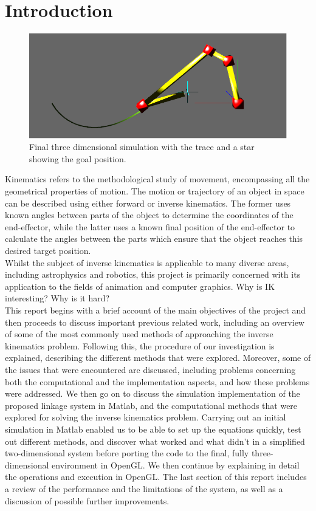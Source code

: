 \documentclass[paper=a4, fontsize=11pt]{scrartcl} %
\numberwithin{equation}{section} %
\numberwithin{figure}{section} %
\numberwithin{table}{section} %
\begin{document}
\section{Introduction}
\begin{figure}
\centering
\includegraphics[scale=0.4]{chain3Dexamplev2}
\caption{Final three dimensional simulation with the trace and a star showing the goal position.}
\label{fig:3Dpicture}
\end{figure}

Kinematics refers to the methodological study of movement, encompassing all the geometrical properties of motion. The motion or trajectory of an object in space can be described using either forward or inverse kinematics. The former uses known angles between parts of the object to determine the coordinates of the end-effector, while the latter uses a known final position of the end-effector to calculate the angles between the parts which ensure that the object reaches this desired target position. \\

Whilst the subject of inverse kinematics is applicable to many diverse areas, including astrophysics and robotics, this project is primarily concerned with its application to the fields of animation and computer graphics. Why is IK interesting? Why is it hard?\\

This report begins with a brief account of the main objectives of the project and then proceeds to discuss important previous related work, including an overview of some of the most commonly used methods of approaching the inverse kinematics problem. Following this, the procedure of our investigation is explained, describing the different methods that were explored. Moreover, some of the issues that were encountered are discussed, including problems concerning both the computational and the implementation aspects, and how these problems were addressed. We then go on to discuss the simulation implementation of the proposed linkage system in Matlab, and the computational methods that were explored for solving the inverse kinematics problem. Carrying out an initial simulation in Matlab enabled us to be able to set up the equations quickly, test out different methods, and discover what worked and what didn't in a simplified two-dimensional system before porting the code to the final, fully three-dimensional environment in OpenGL. We then continue by explaining in detail the operations and execution in OpenGL. The last section of this report includes a review of the performance and the limitations of the system, as well as a discussion of possible further improvements.
\end{document}
